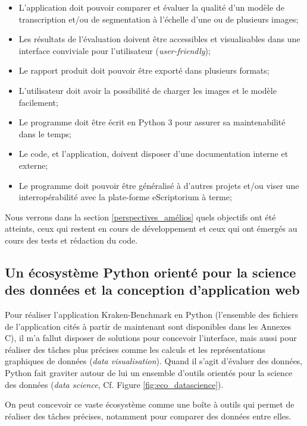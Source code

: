 \begin{itemize}
    \item L'application doit pouvoir comparer et évaluer la qualité d'un modèle de transcription et/ou de segmentation à l'échelle d'une ou de plusieurs images;
    \item Les résultats de l'évaluation doivent être accessibles et visualisables dans une interface conviviale pour l'utilisateur (\textit{user-friendly});
    \item Le rapport produit doit pouvoir être exporté dans plusieurs formats;
    \item L'utilisateur doit avoir la possibilité de charger les images et le modèle facilement;
    \item Le programme doit être écrit en Python 3 pour assurer sa  maintenabilité dans le temps;
    \item Le code, et l'application, doivent disposer d'une documentation interne et externe;
    \item Le programme doit pouvoir être généralisé à d'autres projets et/ou viser une interropérabilité avec la plate-forme eScriptorium à terme;
\end{itemize}

Nous verrons dans la section \ref{perspectives_amélios} quels objectifs ont été atteints, ceux qui restent en cours de développement et ceux qui ont émergés au cours des tests et rédaction du code. 

\subsection{Un écosystème Python orienté pour la science des données et la conception d'application web}

Pour réaliser l'application Kraken-Benchmark en Python (l'ensemble des fichiers de l'application cités à partir de maintenant sont disponibles dans les Annexes C), il m'a fallut disposer de solutions pour concevoir l'interface, mais aussi pour réaliser des tâches plus précises comme les calculs et les représentations graphiques de données (\textit{data visualisation}). Quand il s'agit d'évaluer des données, Python fait graviter autour de lui un ensemble d'outils orientés pour la science des données (\textit{data science}, Cf. Figure \ref{fig:eco_datascience}).

On peut concevoir ce vaste écosystème comme une boîte à outils qui permet de réaliser des tâches précises, notamment pour comparer des données entre elles.  

